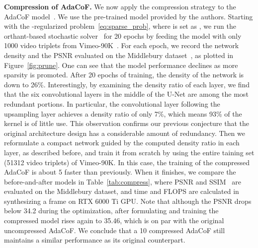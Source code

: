 \documentclass[final]{cvpr}
\newcommand{\myparagraph}[1]{\textbf{#1}}
\begin{document}
\myparagraph{Compression of AdaCoF.} We now apply the compression strategy to the AdaCoF model~\cite{lee2020adacof}. We use the pre-trained model provided by the authors. Starting with the -regularized problem~\eqref{eq:sparse_prob}, where  is set as , we run the orthant-based stochastic solver~\cite{chen2020orthant} for 20 epochs by feeding the model with only 1000 video triplets from Vimeo-90K~\cite{xue2019video}. For each epoch, we record the network density and the PSNR evaluated on the Middlebury dataset~\cite{baker2011database}, as plotted in Figure~\ref{fig:prune}. One can see that the model performance declines as more sparsity is promoted. After 20 epochs of training, the density of the network is down to 26\%. Interestingly, by examining the density ratio of each layer, we find that the six  convolutional layers in the middle of the U-Net are among the most redundant portions. In particular, the  convolutional layer following the upsampling layer achieves a density ratio of only 7\%, which means 93\% of the kernel is of little use. This observation confirms our previous conjecture that the original architecture design has a considerable amount of redundancy. Then we reformulate a compact network guided by the computed density ratio in each layer, as described before, and train it from scratch by using the entire taining set (51312 video triplets) of Vimeo-90K. In this case, the training of the compressed AdaCoF is about 5 faster than previously. When it finishes, we compare the before-and-after models in Table~\ref{tab:compress}, where PSNR and SSIM~\cite{wang2004image} are evaluated on the Middlebury dataset, and time and FLOPS are calculated in synthesizing a  frame on RTX 6000 Ti GPU. Note that although the PSNR drops below 34.2 during the  optimization, after formulating and training the compressed model rises again to 35.46, which is on par with the original uncompressed AdaCoF. We conclude that a 10 compressed AdaCoF still maintains a similar performance as its original counterpart.
\end{document}
